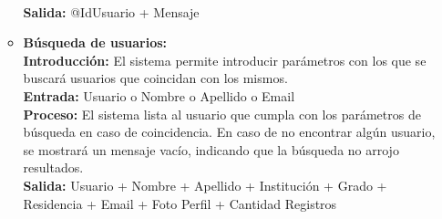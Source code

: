 \begin{enumerate}[A.]
\begin{itemize}
            \\ \textbf{Salida:} @IdUsuario + Mensaje
            \\
          \item \textbf{Búsqueda de usuarios:}
            \\ \textbf{Introducción:} El sistema permite introducir parámetros con los que se buscará usuarios que coincidan con los mismos.
            \\ \textbf{Entrada:} Usuario o Nombre o Apellido o Email
            \\ \textbf{Proceso:} El sistema lista al usuario que cumpla con los parámetros de búsqueda en caso de coincidencia. En caso de no encontrar algún usuario, se mostrará un mensaje vacío, indicando que la búsqueda no arrojo resultados.
            \\ \textbf{Salida:} Usuario + Nombre + Apellido + Institución + Grado + Residencia + Email + Foto Perfil + Cantidad Registros
            \\
        \end{itemize}


\end{enumerate}
